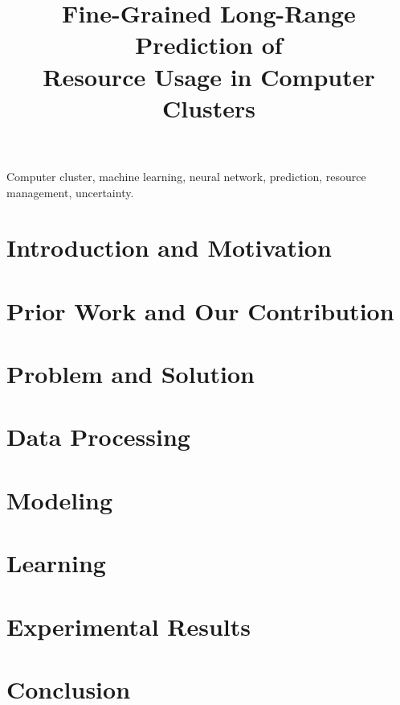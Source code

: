 \documentclass[journal]{IEEEtran}
\title{
  Fine-Grained Long-Range Prediction of\\
  Resource Usage in Computer Clusters
}
\author{}
\begin{document}
  \maketitle

  \begin{abstract}
    
  \end{abstract}

  \begin{IEEEkeywords}
    Computer cluster,
    machine learning,
    neural network,
    prediction,
    resource management,
    uncertainty.
  \end{IEEEkeywords}


  \section{Introduction and Motivation} 
  

  
  \section{Prior Work and Our Contribution} 
  

  
  \section{Problem and Solution} 
  

  \section{Data Processing} 
  

  \section{Modeling} 
  

  \section{Learning} 
  

  \section{Experimental Results} 
  

  \section{Conclusion} 
  
  

  
  
\end{document}
